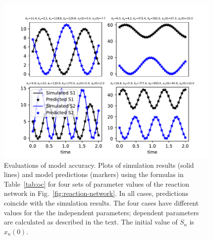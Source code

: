 \documentclass{bmcart}
\newcommand{\fig}[1]{Fig.~\ref{#1}}
\newcommand{\tab}[1]{Table~\ref{#1}}
\begin{document}
\begin{backmatter}
\begin{figure}
        \centering
\includegraphics[scale=0.75]{figures/evaluate_model.pdf}
         \caption{Evaluations of model accuracy.
         Plots of simulation results (solid lines)
         and model predictions (markers) using the formulas in \tab{tab:oc} for four sets of parameter values of
         the reaction network in \fig{fig:reaction-network}.
         In all cases, predictions coincide with the simulation results.
         The four cases have different values for the
         the independent parameters; dependent parameters are calculated as described in the text.
         The initial value of $S_n$ is $x_n (0)$.}
         \label{fig:model-evaluation}
\end{figure}



\end{backmatter}
\end{document}
